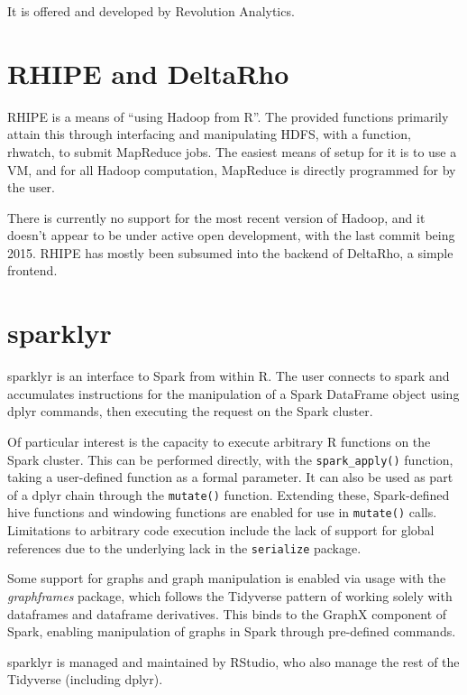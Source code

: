 \documentclass[10pt,a4paper]{article}
\begin{document}
It is offered and developed by Revolution Analytics.

\section{RHIPE and DeltaRho}
\label{sec:rhipe-deltarho}

RHIPE is a means of ``using Hadoop from R''\cite{deltarho:_rhipe}. The
provided functions primarily attain this through interfacing and
manipulating HDFS, with a function, rhwatch, to submit MapReduce jobs.
The easiest means of setup for it is to use a VM, and for all Hadoop
computation, MapReduce is directly programmed for by the user.

There is currently no support for the most recent version of Hadoop,
and it doesn't appear to be under active open development, with the
last commit being 2015. RHIPE has mostly been subsumed into the
backend of DeltaRho, a simple frontend.

\section{sparklyr}
\label{sec:sparklyr}

sparklyr is an interface to Spark from within R\cite{luraschi20}. The user
connects to spark and accumulates instructions for the manipulation of a Spark
DataFrame object using dplyr commands, then executing the request on the Spark
cluster.

Of particular interest is the capacity to execute arbitrary R functions on the
Spark cluster. This can be performed directly, with the \texttt{spark\_apply()}
function, taking a user-defined function as a formal parameter. It can also be
used as part of a dplyr chain through the \texttt{mutate()} function. Extending
these, Spark-defined hive functions and windowing functions are enabled for use
in \texttt{mutate()} calls. Limitations to arbitrary code execution include the
lack of support for global references due to the underlying lack in the
\texttt{serialize} package.

Some support for graphs and graph manipulation is enabled via usage with the
\textit{graphframes} package, which follows the Tidyverse pattern of working
solely with dataframes and dataframe derivatives\cite{kuo18}. This binds to the GraphX
component of Spark, enabling manipulation of graphs in Spark through
pre-defined commands.

sparklyr is managed and maintained by RStudio, who also manage the
rest of the Tidyverse (including dplyr).
\end{document}
